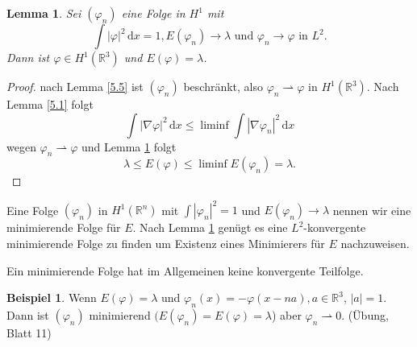 \documentclass[
paper=a4,
bibtotocnumbered,
liststotocnumbered,
tablecaptionabove,
pointlessnumbers,
twoside,
openright,
10pt
]
{report}
\let\phi\varphi
\newtheorem{lem}[thm]{Lemma}
\theoremstyle{definition}
\newtheorem*{bsp}{Beispiel}
\numberwithin{equation}{chapter}
\begin{document}
\begin{lem}\label{5.8}
Sei $(\phi_n)$ eine Folge in $H^1$ mit
\begin{equation}
\int |\phi|^2\, \mathrm dx = 1, E(\phi_n) \to \lambda \text{ und } \phi_n \to \phi \text{ in } L^2.
\end{equation}
Dann ist $\phi \in H^1(\mathbb R^3)$ und $E(\phi) = \lambda$.
\end{lem}
\begin{proof}
nach Lemma \ref{5.5} ist $(\phi_n)$ beschränkt, also $\phi_n \rightharpoonup \phi$ in $H^1(\mathbb R^3)$. Nach Lemma \ref{5.1} folgt
\begin{equation}
\int |\nabla \phi|^2\, \mathrm dx \le \liminf \int |\nabla \phi_n|^2\, \mathrm dx
\end{equation}
wegen $\phi_n \rightharpoonup \phi$ und Lemma \ref{5.8} folgt
\begin{equation}
\lambda \le E(\phi) \le \liminf E(\phi_n) = \lambda.
\end{equation}
\end{proof}
Eine Folge $(\phi_n)$ in $H^1(\mathbb R^n)$ mit $\int |\phi_n|^2=1$ und $E(\phi_n) \to \lambda$ nennen wir eine minimierende Folge für $E$. Nach Lemma \ref{5.8} genügt es eine $L^2$-konvergente minimierende Folge zu finden um Existenz eines Minimierers für $E$ nachzuweisen.  

Ein minimierende Folge hat im Allgemeinen keine konvergente Teilfolge.

\begin{bsp}
Wenn $E(\phi) = \lambda$ und $\phi_n(x) = -\phi(x-na), a\in \mathbb R^3$, $|a|=1$.  Dann ist $(\phi_n)$ minimierend $(E(\phi_n) = E(\phi) = \lambda$) aber $\phi_n \rightharpoonup 0$. (Übung, Blatt 11)
\end{bsp}
\end{document}

